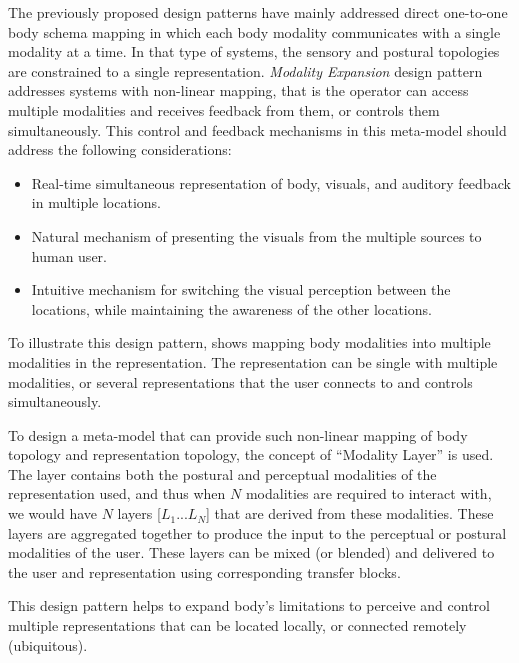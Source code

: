 The previously proposed design patterns have mainly addressed direct one-to-one body schema mapping in which each body modality communicates with a single modality at a time. In that type of systems, the sensory and postural topologies are constrained to a single representation. \textit{Modality Expansion} design pattern addresses systems with non-linear mapping, that is the operator can access multiple modalities and receives feedback from them, or controls them simultaneously. This control and feedback mechanisms in this meta-model should address the following considerations:
\begin{itemize}
  	\setlength\itemsep{0em}
    \item Real-time simultaneous representation of body, visuals, and auditory feedback in multiple locations.
    \item Natural mechanism of presenting the visuals from the multiple sources to human user.
    \item Intuitive mechanism for switching the visual perception between the locations, while maintaining the awareness of the other locations.  
\end{itemize}

To illustrate this design pattern,  shows mapping body modalities into multiple modalities in the representation. The representation can be single with multiple modalities, or several representations that the user connects to and controls simultaneously. 

To design a meta-model that can provide such non-linear mapping of body topology and representation topology, the concept of ``Modality Layer'' is used. The layer contains both the postural and perceptual modalities of the representation used, and thus when $N$ modalities are required to interact with, we would have $N$ layers [$L_{1}...L_{N}$] that are derived from these modalities. These layers are aggregated together to produce the input to the perceptual or postural modalities of the user. These layers can be mixed (or blended) and delivered to the user and representation using corresponding transfer blocks.

This design pattern helps to expand body's limitations to perceive and control multiple representations that can be located locally, or connected remotely (ubiquitous).




